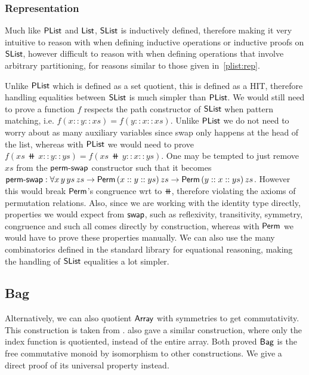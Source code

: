 \subsubsection{Representation}\label{slist:rep}
Much like $\operatorname{\mathsf{PList}}$ and $\operatorname{\mathsf{List}}$, $\operatorname{\mathsf{SList}}$ is inductively defined, therefore making it very intuitive to reason
with when defining inductive operations or inductive proofs on $\operatorname{\mathsf{SList}}$, however difficult to reason with
when defining operations that involve arbitrary partitioning, for reasons similar to those given
in~\cref{plist:rep}.

Unlike $\operatorname{\mathsf{PList}}$ which is defined as a set quotient, this is defined as a HIT, therefore handling equalities
between $\operatorname{\mathsf{SList}}$ is much simpler than $\operatorname{\mathsf{PList}}$. We would still need to prove a function $f$ respects
the path constructor of $\operatorname{\mathsf{SList}}$ when pattern matching, i.e. $f(x :: y :: xs) = f(y :: x :: xs)$.
Unlike $\operatorname{\mathsf{PList}}$ we do not need to worry about as many auxiliary variables since swap
only happens at the head of the list, whereas with $\operatorname{\mathsf{PList}}$ we would need to prove
$f(xs\,\doubleplus\,x :: y :: ys) = f(xs\,\doubleplus\,y :: x :: ys)$. One may be tempted to just remove $xs$
from the $\operatorname{\mathsf{perm-swap}}$ constructor such that it becomes
$\operatorname{\mathsf{perm-swap}} : \forall x\,y\,ys\,zs \to \operatorname{\mathsf{Perm}}\,(x :: y :: ys)\,zs \to \operatorname{\mathsf{Perm}}\,(y :: x :: ys)\,zs$.
However this would break $\operatorname{\mathsf{Perm}}$'s congruence wrt to $\doubleplus$, therefore violating the axioms of
permutation relations. Also, since we are working with the identity type directly, properties we would
expect from $\operatorname{\mathsf{swap}}$, such as reflexivity, transitivity, symmetry, congruence and such all comes directly by
construction, whereas with $\operatorname{\mathsf{Perm}}$ we would have to prove these properties manually.
We can also use the many combinatorics defined in the standard library for equational reasoning,
making the handling of $\operatorname{\mathsf{SList}}$ equalities a lot simpler.

\subsection{Bag}\label{cmon:bag}
Alternatively, we can also quotient $\operatorname{\mathsf{Array}}$ with symmetries to get commutativity.
This construction is taken from \cite{choudhuryFreeCommutativeMonoids2023}. \cite{joramConstructiveFinalSemantics2023}
also gave a similar construction, where only the index function is quotiented, instead of
the entire array. Both proved $\operatorname{\mathsf{Bag}}$ is the free commutative monoid by isomorphism to
other constructions. We give a direct proof of its universal property instead.

